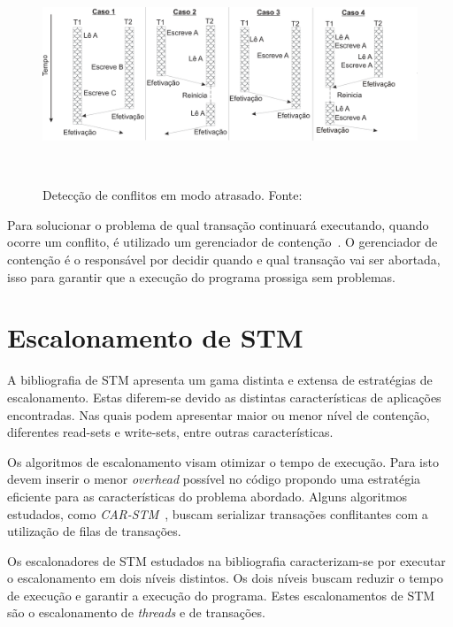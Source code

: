 \documentclass[ti]{texufpel} %
\begin{document}
\begin{figure}[!htp]
\centering
\includegraphics[height=6.5cm]{Imagens/conflitoatrasado.png}
\caption{Detecção de conflitos em modo atrasado. Fonte:~\cite{rigo07}}
\label{figuradeteccaoatrasado}
\end{figure}

Para solucionar o problema de qual transação continuará executando, quando ocorre um conflito, é utilizado um gerenciador de contenção~\cite{harris10}. O gerenciador de contenção é o responsável por decidir quando e qual transação vai ser abortada, isso para garantir que a execução do programa prossiga sem problemas.

\chapter{Escalonamento de STM}

  A bibliografia de STM apresenta um gama distinta e extensa de estratégias de escalonamento. Estas diferem-se devido as distintas características de aplicações encontradas. Nas quais podem apresentar maior ou menor nível de contenção, diferentes read-sets e write-sets, entre outras características.

  Os algoritmos de escalonamento visam otimizar o tempo de execução. Para isto devem inserir o menor \emph{overhead} possível no código propondo uma estratégia eficiente para as características do problema abordado. Alguns algoritmos estudados, como \emph{CAR-STM}~\cite{dolev08}, buscam serializar transações conflitantes com a utilização de filas de transações.

  Os escalonadores de STM estudados na bibliografia caracterizam-se por executar o escalonamento em dois níveis distintos. Os dois níveis buscam reduzir o tempo de execução e garantir a execução do programa. Estes escalonamentos de STM são o escalonamento de \emph{threads} e de transações.
\end{document}
